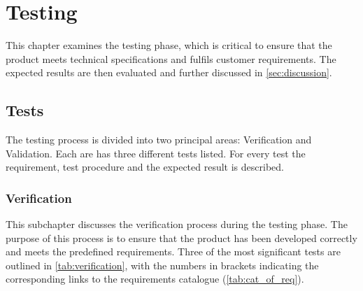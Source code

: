 \documentclass{article}
\begin{document}
\newpage
\section{Testing}
This chapter examines the testing phase, which is critical to ensure that the product
meets technical specifications and fulfils customer requirements. The expected results
are then evaluated and further discussed in \autoref{sec:discussion}.

\subsection{Tests}
The testing process is divided into two principal areas: Verification and Validation. Each
are has three different tests listed. For every test the requirement, test procedure and
the expected result is described.

\subsubsection{Verification}
This subchapter discusses the verification process during the testing phase. The purpose of
this process is to ensure that the product has been developed correctly and meets the
predefined requirements.
Three of the most significant tests are outlined in \autoref{tab:verification}, with the
numbers in brackets indicating the corresponding links to the requirements catalogue (\autoref{tab:cat_of_req}).

\renewcommand{\arraystretch}{1.5}
\end{document}
